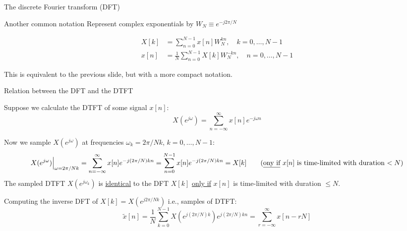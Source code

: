 \documentclass[10pt, aspectratio=169]{beamer}
\begin{document}
%
\begin{frame}{The discrete Fourier transform (DFT)}
\begin{block}{Another common notation}
	Represent complex exponentials by $W_N \equiv e^{-j2\pi/N}$
	
	\begin{align}
	X[k] &= \sum_{n = 0}^{N-1}x[n]W_N^{kn}, \quad k = 0, \ldots, N-1 \tag{direct transform} \\
	x[n] &= \frac{1}{N}\sum_{n = 0}^{N-1}X[k]W_N^{-kn}, \quad n = 0, \ldots, N-1 \tag{inverse transform}
	\end{align}
\end{block}	
This is equivalent to the previous slide, but with a more compact notation.
\end{frame}

%
\begin{frame}{Relation between the DFT and the DTFT}

Suppose we calculate the DTFT of some signal $x[n]$:
\begin{equation*}
X(e^{j\omega}) = \sum_{n=-\infty}^{\infty} x[n]e^{-j\omega n} \tag{DTFT of $x[n]$}
\end{equation*}

\pause
Now we sample $X(e^{j\omega})$ at frequencies $\omega_k = 2\pi/Nk$, $k = 0, \ldots, N-1$:
\begin{align*}
	X(e^{j\omega})\Big|_{\omega = 2\pi/Nk} = \sum_{n=-\infty}^{\infty}x[n]e^{-j(2\pi/N)kn} 
	= \sum_{n=0}^{N-1}x[n]e^{-j(2\pi/N)kn}= X[k] \tag{\underline{ony if} $x[n]$ is time-limited with duration $< N$}
\end{align*}
The sampled DTFT $X(e^{j\omega_k})$ is \underline{identical} to the DFT $X[k]$ \underline{only if} $x[n]$ is time-limited with duration $\leq N$.

\pause
Computing the inverse DFT of $X[k] = X(e^{j2\pi/Nk})$ i.e., samples of DTFT:
\begin{equation} \label{eq:replicated_xn}
	\tilde{x}[n] = \frac{1}{N}\sum_{k=0}^{N-1}X(e^{j(2\pi/N)k})e^{j(2\pi/N)kn} = \sum_{r=-\infty}^{\infty} x[n-rN]
\end{equation}
\end{frame}
\end{document}

